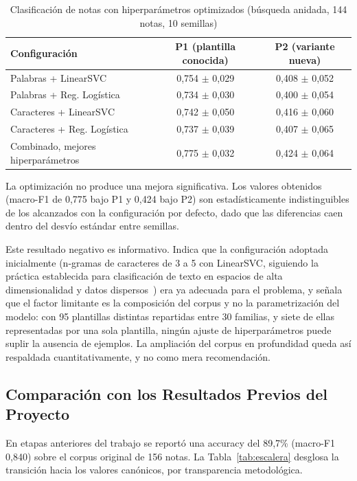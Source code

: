 \begin{table}[ht]
\centering
\caption{Clasificación de notas con hiperparámetros optimizados (búsqueda anidada, 144 notas, 10 semillas)}
\label{tab:exp3_hiperparametros}
\begin{tabular}{|l|c|c|}
\hline
\textbf{Configuración} & \textbf{P1 (plantilla conocida)} & \textbf{P2 (variante nueva)} \\
\hline
Palabras + LinearSVC & 0,754 $\pm$ 0,029 & 0,408 $\pm$ 0,052 \\
Palabras + Reg. Logística & 0,734 $\pm$ 0,030 & 0,400 $\pm$ 0,054 \\
Caracteres + LinearSVC & 0,742 $\pm$ 0,050 & 0,416 $\pm$ 0,060 \\
Caracteres + Reg. Logística & 0,737 $\pm$ 0,039 & 0,407 $\pm$ 0,065 \\
Combinado, mejores hiperparámetros & 0,775 $\pm$ 0,032 & 0,424 $\pm$ 0,064 \\
\hline
\end{tabular}
\end{table}

La optimización no produce una mejora significativa. Los valores obtenidos (macro-F1 de 0,775 bajo P1 y 0,424 bajo P2) son estadísticamente indistinguibles de los alcanzados con la configuración por defecto, dado que las diferencias caen dentro del desvío estándar entre semillas.

Este resultado negativo es informativo. Indica que la configuración adoptada inicialmente (n-gramas de caracteres de 3 a 5 con LinearSVC, siguiendo la práctica establecida para clasificación de texto en espacios de alta dimensionalidad y datos dispersos~\cite{joachims1998}) era ya adecuada para el problema, y señala que el factor limitante es la composición del corpus y no la parametrización del modelo: con 95 plantillas distintas repartidas entre 30 familias, y siete de ellas representadas por una sola plantilla, ningún ajuste de hiperparámetros puede suplir la ausencia de ejemplos. La ampliación del corpus en profundidad queda así respaldada cuantitativamente, y no como mera recomendación.

\subsection{Comparación con los Resultados Previos del Proyecto}
\label{subsec:res_escalera}

En etapas anteriores del trabajo se reportó una accuracy del 89,7\% (macro-F1 0,840) sobre el corpus original de 156 notas. La Tabla~\ref{tab:escalera} desglosa la transición hacia los valores canónicos, por transparencia metodológica.


